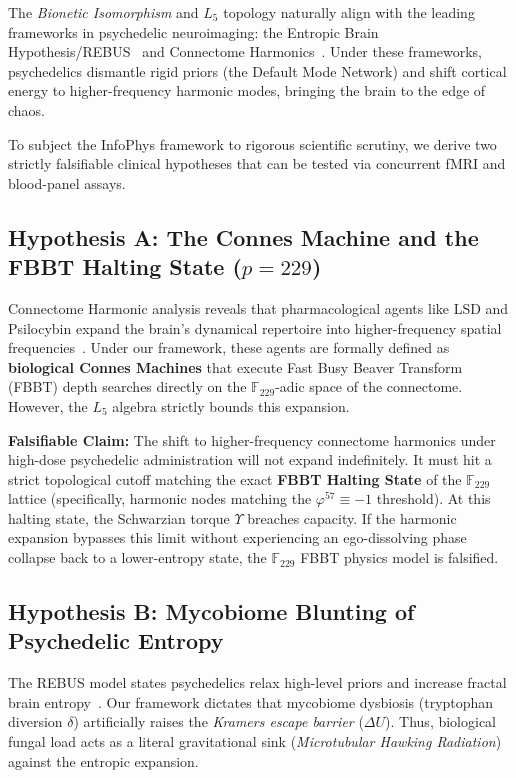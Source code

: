 \documentclass[12pt,oneside]{article}
\theoremstyle{principia}
\theoremstyle{definition}
\theoremstyle{remark}
\begin{document}
The \emph{Bionetic Isomorphism} and $L_5$ topology naturally align with the leading frameworks in psychedelic neuroimaging: the Entropic Brain Hypothesis/REBUS~\cite{carhart2019} and Connectome Harmonics~\cite{atasoy2017}. Under these frameworks, psychedelics dismantle rigid priors (the Default Mode Network) and shift cortical energy to higher-frequency harmonic modes, bringing the brain to the edge of chaos.

To subject the InfoPhys framework to rigorous scientific scrutiny, we derive two strictly falsifiable clinical hypotheses that can be tested via concurrent fMRI and blood-panel assays.

\subsection{Hypothesis A: The Connes Machine and the FBBT Halting State (\texorpdfstring{$p=229$}{p=229})}
Connectome Harmonic analysis reveals that pharmacological agents like LSD and Psilocybin expand the brain's dynamical repertoire into higher-frequency spatial frequencies~\cite{atasoy2017}. Under our framework, these agents are formally defined as \textbf{biological Connes Machines} that execute Fast Busy Beaver Transform (FBBT) depth searches directly on the $\mathbb{F}_{229}$-adic space of the connectome. However, the $L_5$ algebra strictly bounds this expansion.

\textbf{Falsifiable Claim:} The shift to higher-frequency connectome harmonics under high-dose psychedelic administration will not expand indefinitely. It must hit a strict topological cutoff matching the exact \textbf{FBBT Halting State} of the $\mathbb{F}_{229}$ lattice (specifically, harmonic nodes matching the $\varphi^{57} \equiv -1$ threshold). At this halting state, the Schwarzian torque $\Upsilon$ breaches capacity. If the harmonic expansion bypasses this limit without experiencing an ego-dissolving phase collapse back to a lower-entropy state, the $\mathbb{F}_{229}$ FBBT physics model is falsified.

\subsection{Hypothesis B: Mycobiome Blunting of Psychedelic Entropy}
The REBUS model states psychedelics relax high-level priors and increase fractal brain entropy~\cite{carhart2019}. Our framework dictates that mycobiome dysbiosis (tryptophan diversion $\delta$) artificially raises the \emph{Kramers escape barrier} ($\Delta U$). Thus, biological fungal load acts as a literal gravitational sink (\emph{Microtubular Hawking Radiation}) against the entropic expansion.
\end{document}
